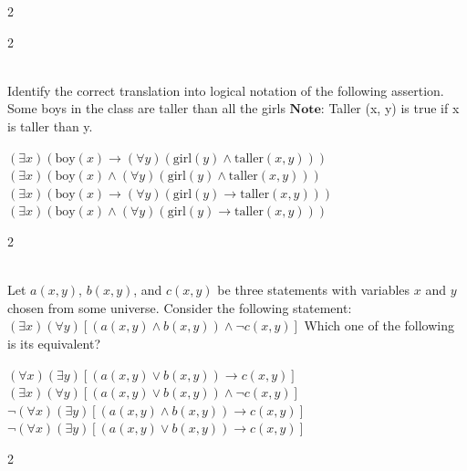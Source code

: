 \documentclass[12pt]{exam}
\begin{document}
\begin{questions}
\begin{multicols*}{2}
\end{multicols*}
\vspace{0.6cm}
\newpage
\begin{multicols*}{2}

 \\[0.2cm]
{\Large Identify the correct translation into logical notation of the following assertion. Some boys in the class are taller than all the girls\newline
$\textbf{Note:}$ Taller (x, y) is true if x is taller than y.}
\begin{choices}
  \choice $(\exists x) (\text{boy}(x) \to (\forall y) (\text{girl}(y) \wedge \text{taller} (x, y)))$
  \choice $(\exists x) (\text{boy}(x) \wedge (\forall y) (\text{girl}(y) \wedge \text{taller} (x, y)))$
  \choice $(\exists x) (\text{boy}(x) \to (\forall y) (\text{girl}(y) \to \text{taller} (x, y)))$
  \choice $(\exists x) (\text{boy}(x) \wedge (\forall y) (\text{girl}(y) \to \text{taller} (x, y)))$
\end{choices}

\end{multicols*}
\vspace{0.6cm}
\newpage
\begin{multicols*}{2}

 \\[0.2cm]
{\Large Let $a(x, y)$, $b(x, y)$, and $c(x, y)$ be three statements with variables $x$ and $y$ chosen from some universe. Consider the following statement:\newline
 $(\exists x)(\forall y)[(a(x, y) \wedge b(x, y)) \wedge \neg c(x, y)]$\newline
Which one of the following is its equivalent?}
\begin{choices}
  \choice $(\forall x)(\exists y)[(a(x, y) \vee b(x, y)) \to c(x, y)]$
  \choice $(\exists x)(\forall y)[(a(x, y) \vee b(x, y)) \wedge \neg c(x, y)]$
  \choice $\neg (\forall x)(\exists y)[(a(x, y) \wedge b(x, y)) \to c(x, y)]$
  \choice $\neg (\forall x)(\exists y)[(a(x, y) \vee b(x, y)) \to c(x, y)]$
\end{choices}

\end{multicols*}
\vspace{0.6cm}
\newpage
\begin{multicols*}{2}


\end{multicols*}
\end{questions}
\end{document}
